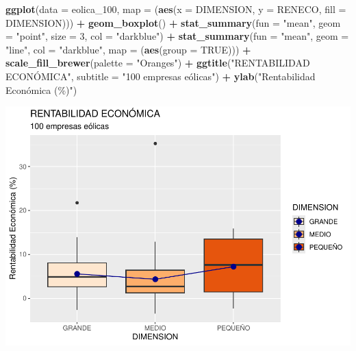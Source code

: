 \documentclass[
]{book}
\newenvironment{Shaded}{\begin{snugshade}}{\end{snugshade}}
\newcommand{\AttributeTok}[1]{\textcolor[rgb]{0.13,0.29,0.53}{#1}}
\newcommand{\ConstantTok}[1]{\textcolor[rgb]{0.56,0.35,0.01}{#1}}
\newcommand{\DecValTok}[1]{\textcolor[rgb]{0.00,0.00,0.81}{#1}}
\newcommand{\FunctionTok}[1]{\textcolor[rgb]{0.13,0.29,0.53}{\textbf{#1}}}
\newcommand{\NormalTok}[1]{#1}
\newcommand{\SpecialCharTok}[1]{\textcolor[rgb]{0.81,0.36,0.00}{\textbf{#1}}}
\newcommand{\StringTok}[1]{\textcolor[rgb]{0.31,0.60,0.02}{#1}}
\let\Oldincludegraphics\includegraphics
\renewcommand{\includegraphics}[2][]{%
  \Oldincludegraphics[#1]{#2}%
}
\begin{document}
\begin{Shaded}
\begin{Highlighting}[]
\FunctionTok{ggplot}\NormalTok{(}\AttributeTok{data =}\NormalTok{ eolica\_100, }\AttributeTok{map =}\NormalTok{ (}\FunctionTok{aes}\NormalTok{(}\AttributeTok{x =}\NormalTok{ DIMENSION, }\AttributeTok{y =}\NormalTok{ RENECO, }\AttributeTok{fill =}\NormalTok{ DIMENSION))) }\SpecialCharTok{+}
  \FunctionTok{geom\_boxplot}\NormalTok{() }\SpecialCharTok{+}
  \FunctionTok{stat\_summary}\NormalTok{(}\AttributeTok{fun =} \StringTok{"mean"}\NormalTok{,}
               \AttributeTok{geom =} \StringTok{"point"}\NormalTok{,}
               \AttributeTok{size =} \DecValTok{3}\NormalTok{,}
               \AttributeTok{col =} \StringTok{"darkblue"}\NormalTok{) }\SpecialCharTok{+}
  \FunctionTok{stat\_summary}\NormalTok{(}\AttributeTok{fun =} \StringTok{"mean"}\NormalTok{,}
               \AttributeTok{geom =} \StringTok{"line"}\NormalTok{,}
               \AttributeTok{col =} \StringTok{"darkblue"}\NormalTok{,}
               \AttributeTok{map =}\NormalTok{ (}\FunctionTok{aes}\NormalTok{(}\AttributeTok{group =} \ConstantTok{TRUE}\NormalTok{))) }\SpecialCharTok{+}
  \FunctionTok{scale\_fill\_brewer}\NormalTok{(}\AttributeTok{palette =} \StringTok{"Oranges"}\NormalTok{) }\SpecialCharTok{+}
  \FunctionTok{ggtitle}\NormalTok{(}\StringTok{"RENTABILIDAD ECONÓMICA"}\NormalTok{, }\AttributeTok{subtitle =} \StringTok{"100 empresas eólicas"}\NormalTok{) }\SpecialCharTok{+}
  \FunctionTok{ylab}\NormalTok{(}\StringTok{"Rentabilidad Económica (\%)"}\NormalTok{)}
\end{Highlighting}
\end{Shaded}

\includegraphics{_main_files/figure-latex/unnamed-chunk-115-1.pdf}
\end{document}
